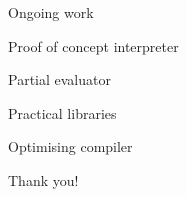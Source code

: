 %
%

\begin{frame}[fragile]{Ongoing work}
\begin{todolist}
  \item[\done] Proof of concept interpreter
  \item Partial evaluator
  \item Practical libraries
  \item Optimising compiler
\end{todolist}
\end{frame}

\begin{frame}
\begin{center}
\Huge Thank you!
\end{center}
\end{frame}


